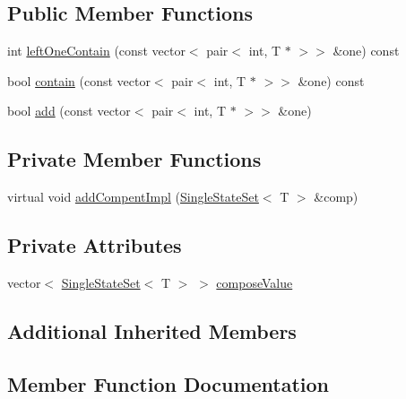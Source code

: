 \subsection*{Public Member Functions}
\begin{DoxyCompactItemize}
\item 
int \mbox{\hyperlink{classgraphsat_1_1_complete_compact_compose_state_set_a6e731c47f2ab2415306aab198c7c4151}{left\+One\+Contain}} (const vector$<$ pair$<$ int, T $\ast$ $>$$>$ \&one) const
\item 
bool \mbox{\hyperlink{classgraphsat_1_1_complete_compact_compose_state_set_a2ba10c7aa62262e0c7cc009573cd7a01}{contain}} (const vector$<$ pair$<$ int, T $\ast$ $>$$>$ \&one) const
\item 
bool \mbox{\hyperlink{classgraphsat_1_1_complete_compact_compose_state_set_aaf32e840a543a728f1b849e6c8aecab8}{add}} (const vector$<$ pair$<$ int, T $\ast$ $>$$>$ \&one)
\end{DoxyCompactItemize}
\subsection*{Private Member Functions}
\begin{DoxyCompactItemize}
\item 
virtual void \mbox{\hyperlink{classgraphsat_1_1_complete_compact_compose_state_set_af45ca7e6d6b308d8bdb6f91e0d7830c0}{add\+Compent\+Impl}} (\mbox{\hyperlink{classgraphsat_1_1_single_state_set}{Single\+State\+Set}}$<$ T $>$ \&comp)
\end{DoxyCompactItemize}
\subsection*{Private Attributes}
\begin{DoxyCompactItemize}
\item 
vector$<$ \mbox{\hyperlink{classgraphsat_1_1_single_state_set}{Single\+State\+Set}}$<$ T $>$ $>$ \mbox{\hyperlink{classgraphsat_1_1_complete_compact_compose_state_set_ad9f28cc7d42cc49dd6bb3c90c9b6b65d}{compose\+Value}}
\end{DoxyCompactItemize}
\subsection*{Additional Inherited Members}


\subsection{Member Function Documentation}
\mbox{\label{classgraphsat_1_1_complete_compact_compose_state_set_aaf32e840a543a728f1b849e6c8aecab8}} 
